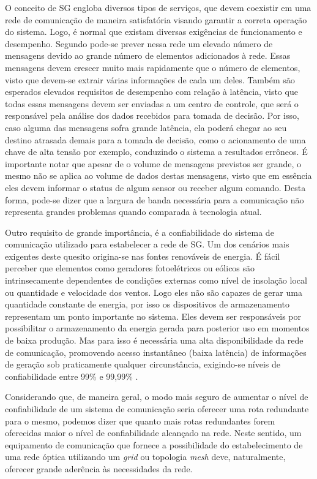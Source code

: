 \documentclass[12pt]{article}
\begin{document}
O conceito de SG engloba diversos tipos de serviços, que devem coexistir em uma rede de comunicação de maneira satisfatória visando garantir a correta operação do sistema. Logo, é normal que existam diversas exigências de funcionamento e desempenho. Segundo \cite{Art_Aggarwal2010} pode-se prever nessa rede um elevado número de mensagens devido ao grande número de elementos adicionados à rede. Essas mensagens devem crescer muito mais rapidamente que o número de elementos, visto que devem-se extrair várias informações de cada um deles. Também são esperados elevados requisitos de desempenho com relação à latência, visto que todas essas mensagens devem ser enviadas a um centro de controle, que será o responsável pela análise dos dados recebidos para tomada de decisão. Por isso, caso alguma das mensagens sofra grande latência, ela poderá chegar ao seu destino atrasada demais para a tomada de decisão, como o acionamento de uma chave de alta tensão por exemplo, conduzindo o sistema a resultados errôneos. É importante notar que apesar de o volume de mensagens previstos ser grande, o mesmo não se aplica ao volume de dados destas mensagens, visto que em essência eles devem informar o status de algum sensor ou receber algum comando. Desta forma, pode-se dizer que a largura de banda necessária para a comunicação não representa grandes problemas quando comparada à tecnologia atual.

Outro requisito de grande importância, é a confiabilidade do sistema de comunicação utilizado para estabelecer a rede de SG. Um dos cenários mais exigentes deste quesito origina-se nas fontes renováveis de energia. É fácil perceber que elementos como geradores fotoelétricos ou eólicos são intrinsecamente dependentes de condições externas como nível de insolação local ou quantidade e velocidade dos ventos. Logo eles não são capazes de gerar uma quantidade constante de energia, por isso os dispositivos de armazenamento representam um ponto importante no sistema. Eles devem ser responsáveis por possibilitar o armazenamento da energia gerada para posterior uso em momentos de baixa produção. Mas para isso é necessária uma alta disponibilidade da rede de comunicação, promovendo acesso instantâneo (baixa latência) de informações de geração sob praticamente qualquer circunstância, exigindo-se níveis de confiabilidade entre 99\% e 99,99\% \cite{Art_Gungor2013}.

Considerando que, de maneira geral, o modo mais seguro de aumentar o nível de confiabilidade de um sistema de comunicação seria oferecer uma rota redundante para o mesmo, podemos dizer que quanto mais rotas redundantes forem oferecidas maior o nível de confiabilidade alcançado na rede. Neste sentido, um equipamento de comunicação que fornece a possibilidade do estabelecimento de uma rede óptica utilizando um \emph{grid} ou topologia \emph{mesh} deve, naturalmente, oferecer grande aderência às necessidades da rede.
\end{document}
